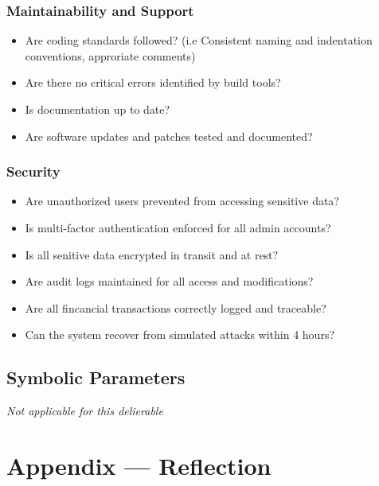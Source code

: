 \documentclass[12pt, titlepage]{article}
\begin{document}
\subsubsection{Maintainability and Support}
  \begin{itemize}[label=$\square$] %
    \item Are coding standards followed? (i.e Consistent naming and indentation conventions, approriate comments)
    \item Are there no critical errors identified by build tools?
    \item Is documentation up to date?
    \item Are software updates and patches tested and documented?
  \end{itemize}

\hypertarget{checklist-nfr15}{}
\subsubsection{Security}
  \begin{itemize}[label=$\square$] %
    \item Are unauthorized users prevented from accessing sensitive data?
    \item Is multi-factor authentication enforced for all admin accounts?
    \item Is all senitive data encrypted in transit and at rest?
    \item Are audit logs maintained for all access and modifications?
    \item Are all fincancial transactions correctly logged and traceable?
    \item Can the system recover from simulated attacks within 4 hours?
  \end{itemize}





\subsection{Symbolic Parameters}

\textit{Not applicable for this delierable}


\newpage{}
\section*{Appendix --- Reflection}
\end{document}
